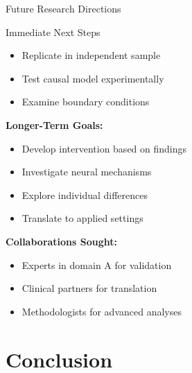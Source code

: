 \documentclass[aspectratio=169,11pt]{beamer}
\begin{document}
\begin{frame}{Future Research Directions}
  \begin{block}{Immediate Next Steps}
    \begin{itemize}
      \item Replicate in independent sample
      \item Test causal model experimentally
      \item Examine boundary conditions
    \end{itemize}
  \end{block}
  
  \vspace{0.5cm}
  
  \textbf{Longer-Term Goals:}
  \begin{itemize}
    \item Develop intervention based on findings
    \item Investigate neural mechanisms
    \item Explore individual differences
    \item Translate to applied settings
  \end{itemize}
  
  \vspace{0.5cm}
  
  \textbf{Collaborations Sought:}
  \begin{itemize}
    \item Experts in domain A for validation
    \item Clinical partners for translation
    \item Methodologists for advanced analyses
  \end{itemize}
\end{frame}


\section{Conclusion}
\end{document}
